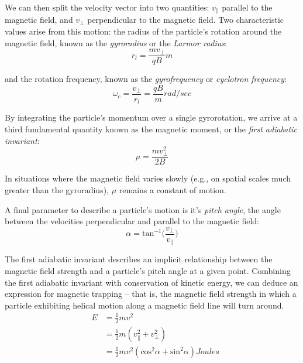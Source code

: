 We can then split the velocity vector into two quantities: $v_\parallel$ parallel to the magnetic field, and $v_\perp$ perpendicular to the magnetic field. Two characteristic values arise from this motion: the radius of the particle's rotation around the magnetic field, known as the \emph{gyroradius} or the \emph{Larmor radius}:
\begin{equation}
r_l = \frac{m v_\perp}{qB} \unit{m}
\end{equation}

\noindent and the rotation frequency, known as the \emph{gyrofrequency} or \emph{cyclotron frequency}:
\begin{equation}
\omega_c = \frac{v_\perp}{r_l} = \frac{q B}{m} \unit{rad/sec}
\end{equation}

\noindent By integrating the particle's momentum over a single gyrorotation, we arrive at a third fundamental quantity known as the magnetic moment, or the \emph{first adiabatic invariant}:
\begin{equation}
\mu = \frac{m v_\perp^2}{2B}
\label{eqn:first_adiabatic_invariant}
\end{equation}

\noindent In situations where the magnetic field varies slowly (e.g., on spatial scales much greater than the gyroradius), $\mu$ remains a constant of motion.

A final parameter to describe a particle's motion is it's \emph{pitch angle}, the angle between the velocities perpendicular and parallel to the magnetic field:
\begin{equation}
\alpha = \mathrm{tan}^{-1}\bigg(\frac{v_\perp}{v_\parallel}\bigg)
\end{equation}

The first adiabatic invariant describes an implicit relationship between the magnetic field strength and a particle's pitch angle at a given point. 
Combining the first adiabatic invariant with conservation of kinetic energy, we can deduce an expression for magnetic trapping -- that is, the magnetic field strength in which a particle exhibiting helical motion along a magnetic field line will turn around. 
\begin{eqnarray}
& E &= \frac{1}{2}mv^2 \\
& &= \frac{1}{2}m(v_\parallel^2 + v_\perp^2) \\
 & &= \frac{1}{2}mv^2(\mathrm{cos}^2\alpha + \mathrm{sin}^2\alpha) \unit{Joules}
\end{eqnarray}

